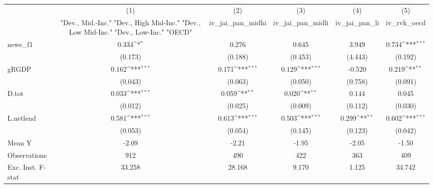{
\def\sym#1{\ifmmode^{#1}\else\(^{#1}\)\fi}
\begin{tabular}{l*{5}{c}}
\toprule
            &\multicolumn{1}{c}{(1)}&\multicolumn{1}{c}{(2)}&\multicolumn{1}{c}{(3)}&\multicolumn{1}{c}{(4)}&\multicolumn{1}{c}{(5)}\\
            &\multicolumn{1}{c}{ "Dev., Mid.-Inc." "Dev., High Mid-Inc." "Dev., Low Mid-Inc." "Dev., Low-Inc." "OECD" }&\multicolumn{1}{c}{iv\_jai\_pan\_midhi}&\multicolumn{1}{c}{iv\_jai\_pan\_midli}&\multicolumn{1}{c}{iv\_jai\_pan\_li}&\multicolumn{1}{c}{iv\_rvk\_oecd}\\
\midrule
news\_f1     &       0.334\sym{*}  &       0.276         &       0.645         &       3.949         &       0.734\sym{***}\\
            &     (0.173)         &     (0.188)         &     (0.453)         &     (4.443)         &     (0.192)         \\
\addlinespace
gRGDP       &       0.162\sym{***}&       0.171\sym{***}&       0.129\sym{***}&      -0.520         &       0.219\sym{**} \\
            &     (0.043)         &     (0.063)         &     (0.050)         &     (0.758)         &     (0.091)         \\
\addlinespace
D.tot       &       0.033\sym{***}&       0.059\sym{**} &       0.020\sym{**} &       0.144         &       0.045         \\
            &     (0.012)         &     (0.025)         &     (0.009)         &     (0.112)         &     (0.030)         \\
\addlinespace
L.netlend   &       0.581\sym{***}&       0.613\sym{***}&       0.503\sym{***}&       0.299\sym{**} &       0.602\sym{***}\\
            &     (0.053)         &     (0.054)         &     (0.145)         &     (0.123)         &     (0.042)         \\
\midrule
Mean Y      &       -2.09         &       -2.21         &       -1.95         &       -2.05         &       -1.50         \\
Observations&         912         &         490         &         422         &         363         &         409         \\
Exc. Inst. F-stat&      33.258         &      28.168         &       9.170         &       1.125         &      34.742         \\
\bottomrule
\end{tabular}
}
